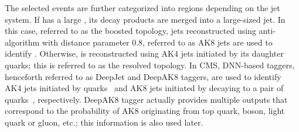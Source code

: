 \documentclass[a4paper,11pt]{article}
\newcommand{\Pb}{{{\Pqb}}\xspace}
\begin{document}
The selected events are further categorized into regions depending on the jet system. 
If \PH has a large \pt, its decay products are merged into a large-sized jet. 
In this case, referred to as the boosted topology, 
jets reconstructed using anti-\kt algorithm with distance parameter 0.8, referred to as AK$8$ jets are used to identify \PH.
Otherwise, \PH is reconstructed using AK$4$ jets initiated by its daughter \Pb quarks; 
this is referred to as the resolved topology.
In CMS, DNN-based taggers, henceforth referred to as DeepJet and DeepAK8 taggers, are used to identify AK4 jets initiated by \Pb quarks~\cite{Bols:2020bkb} and AK8 jets initiated by \PH decaying to a pair of \Pb quarks~\cite{Sirunyan:2020lcu}, respectively.
DeepAK8 tagger actually provides multiple outputs that correspond to the probability of AK8 originating from top quark, \PW boson, light quark or gluon, etc.; this information is also used later.
\end{document}
